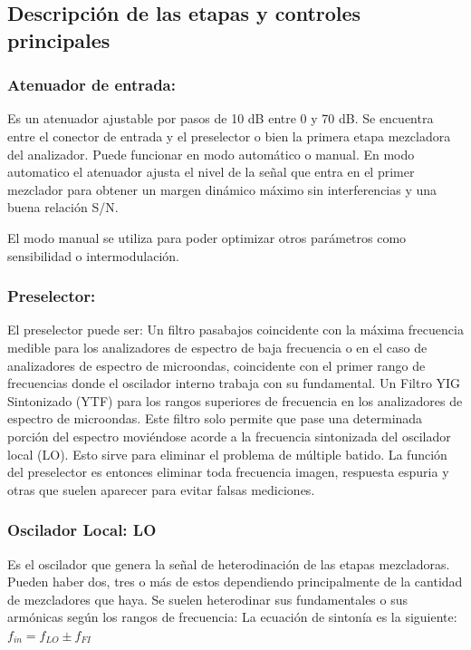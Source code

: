 \documentclass[a4paper,12pt,twoside]{article}
\begin{document}
\subsection{Descripción de las etapas y controles principales}

\subsubsection{Atenuador de entrada:}

Es un atenuador ajustable por pasos de 10 dB entre 0 y 70 dB. Se encuentra entre el conector de
entrada y el preselector o bien la primera etapa mezcladora del analizador.
Puede funcionar en modo automático o manual.
En modo automatico el atenuador ajusta el nivel de la señal que entra en el primer mezclador para obtener un margen
dinámico máximo sin interferencias y una buena relación S/N.

El modo manual se utiliza para poder optimizar otros parámetros como sensibilidad o intermodulación.

\subsubsection{ Preselector:}
El preselector puede ser:
Un filtro pasabajos coincidente con la máxima frecuencia medible para los analizadores de
espectro de baja frecuencia o en el caso de analizadores de espectro de microondas, coincidente
con el primer rango de frecuencias donde el oscilador interno trabaja con su fundamental.
Un Filtro YIG Sintonizado (YTF) para los rangos superiores de frecuencia en los analizadores de
espectro de microondas. Este filtro solo permite que pase una determinada porción del espectro
moviéndose acorde a la frecuencia sintonizada del oscilador local (LO). Esto sirve para eliminar
el problema de múltiple batido.
La función del preselector es entonces eliminar toda frecuencia imagen, respuesta espuria y otras
que suelen aparecer para evitar falsas mediciones.

\subsubsection{Oscilador Local: LO}
Es el oscilador que genera la señal de heterodinación de las etapas mezcladoras. Pueden haber
dos, tres o más de estos dependiendo principalmente de la cantidad de mezcladores que haya. Se
suelen heterodinar sus fundamentales o sus armónicas según los rangos de frecuencia:
La ecuación de sintonía es la siguiente:
$ f_{in} = f_{LO} \pm f_{FI} $
\end{document}
